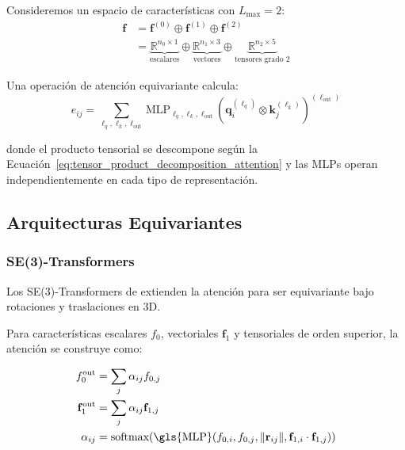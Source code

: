 \begin{example}\label{ex:feature_space_decomposition}
Consideremos un espacio de características con $L_{\max} = 2$:
\begin{align}
\mathbf{f} &= \mathbf{f}^{(0)} \oplus \mathbf{f}^{(1)} \oplus \mathbf{f}^{(2)} \\
&= \underbrace{\mathbb{R}^{n_0 \times 1}}_{\text{escalares}} \oplus \underbrace{\mathbb{R}^{n_1 \times 3}}_{\text{vectores}} \oplus \underbrace{\mathbb{R}^{n_2 \times 5}}_{\text{tensores grado 2}}
\label{eq:feature_space_example}
\end{align}

Una operación de atención equivariante calcula:
\begin{equation}
e_{ij} = \sum_{\ell_q, \ell_k, \ell_{\text{out}}} \text{MLP}_{\ell_q, \ell_k, \ell_{\text{out}}} \left( \mathbf{q}_i^{(\ell_q)} \otimes \mathbf{k}_j^{(\ell_k)} \right)^{(\ell_{\text{out}})}
\label{eq:equivariant_attention_score_irreps}
\end{equation}

donde el producto tensorial se descompone según la Ecuación~\eqref{eq:tensor_product_decomposition_attention} y las MLPs operan independientemente en cada tipo de representación.
\end{example}

\subsection{Arquitecturas Equivariantes}\label{sec:equivariant_transformers}

\subsubsection[SE(3)-Transformers]{SE(3)-\glspl{Transformer}}

Los SE(3)-\glspl{Transformer} de \citet{fuchs2020se3transformers} extienden la atención para ser equivariante bajo rotaciones y traslaciones en 3D.

Para características escalares $f_0$, vectoriales $\mathbf{f}_1$ y tensoriales de orden superior, la atención se construye como:

\begin{align}
    f_0^{\text{out}} &= \sum_j \alpha_{ij} f_{0,j} \\
    \mathbf{f}_1^{\text{out}} &= \sum_j \alpha_{ij} \mathbf{f}_{1,j} \\
    \alpha_{ij} &= \text{softmax}(\text{\gls{MLP}}(f_{0,i}, f_{0,j}, \|\mathbf{r}_{ij}\|, \mathbf{f}_{1,i} \cdot \mathbf{f}_{1,j}))
    \label{eq:se3_transformer_attention}
\end{align}

